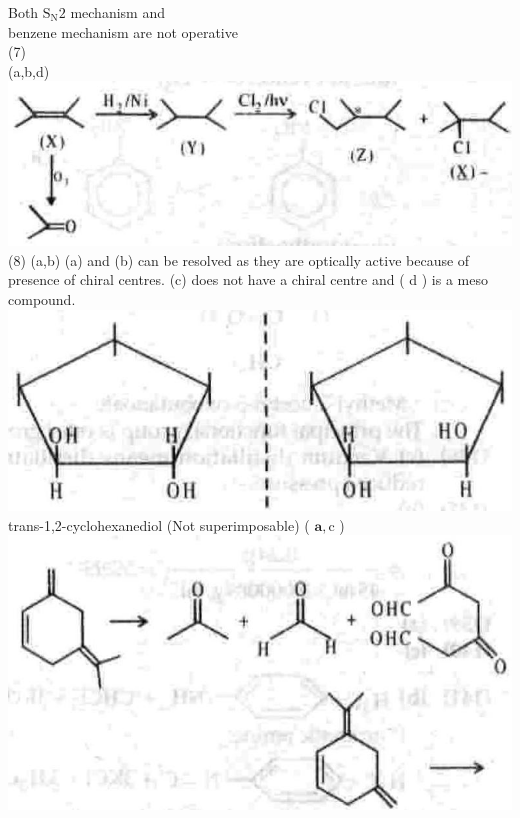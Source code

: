 \documentclass[10pt]{article}
\begin{document}
Both $\mathrm{S}_{\mathrm{N}} 2$ mechanism and\\
benzene mechanism are not operative\\
(7)\\
(a,b,d)\\
\includegraphics[max width=\textwidth, center]{2025_01_28_8470952b98110cec3aabg-164(2)}\\
(8) (a,b) (a) and (b) can be resolved as they are optically active because of presence of chiral centres. (c) does not have a chiral centre and ( d ) is a meso compound.\\
\includegraphics[max width=\textwidth, center]{2025_01_28_8470952b98110cec3aabg-164(5)}\\
trans-1,2-cyclohexanediol (Not superimposable) ( $\mathbf{a}, \mathrm{c}$ )\\
\includegraphics[max width=\textwidth, center]{2025_01_28_8470952b98110cec3aabg-164(4)}\\
\end{document}

